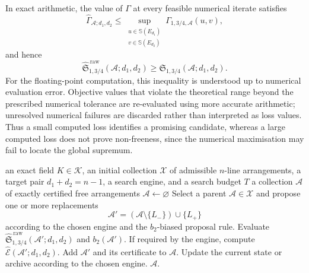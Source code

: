 \documentclass[pdflatex,sn-mathphys-num]{sn-jnl}%
\theoremstyle{remark}
\theoremstyle{definition}
\begin{document}
In exact arithmetic, the value of $\Gamma$ at every feasible numerical iterate satisfies
\[
\widehat{\Gamma}_{\mathcal{A};d_1,d_2}
\leq
\sup_{\substack{u\in\mathbb S(E_{d_1})\\
 v\in\mathbb S(E_{d_2})}}
\Gamma_{1,3/4,\mathcal{A}}(u,v),
\]
and hence
\[
\widehat{\mathfrak S}^{\,\mathrm{raw}}_{1,3/4}
(\mathcal{A};d_1,d_2)
\geq
\mathfrak S_{1,3/4}(\mathcal{A};d_1,d_2).
\]
For the floating-point computation, this inequality is understood up to numerical evaluation error. Objective values that violate the theoretical range beyond the prescribed numerical tolerance are re-evaluated using more accurate arithmetic; unresolved numerical failures are discarded rather than interpreted as loss values. Thus a small computed loss identifies a promising candidate, whereas a large computed loss does not prove non-freeness, since the numerical maximisation may fail to locate the global supremum.

\begin{algorithm}[t]
\caption{Line-replacement search at fixed $(n,d_1,d_2)$}
\label{alg:general-search}
\begin{algorithmic}[1]
\Require an exact field $K\in\mathscr K$, an initial collection
$\mathscr X$ of admissible $n$-line arrangements, a target pair
$d_1+d_2=n-1$, a search engine, and a search budget $T$
\Ensure a collection $\mathscr A$ of exactly certified free arrangements
\State $\mathscr A\gets\varnothing$
  \State Select a parent $\mathcal{A}\in\mathscr X$ and propose one or more
  replacements
  \[
  \mathcal{A}'
  =
  (\mathcal{A}\setminus\{L_-\})\cup\{L_+\}
  \]
  according to the chosen engine and the $b_2$-biased proposal rule.
  \State Evaluate
  $\widehat{\mathfrak S}^{\,\mathrm{raw}}_{1,3/4}
  (\mathcal{A}';d_1,d_2)$ and $b_2(\mathcal{A}')$.
  \State If required by the engine, compute
  $\widehat{\mathcal E}(\mathcal{A}';d_1,d_2)$.
 \State Add $\mathcal{A}'$ and its certificate to
 $\mathscr A$.
 \EndIf
  \EndIf
  \EndIf
  \EndFor
  \State Update the current state or archive according to the chosen engine.
\EndWhile
\State \Return $\mathscr A$.
\end{algorithmic}
\end{algorithm}
\end{document}
